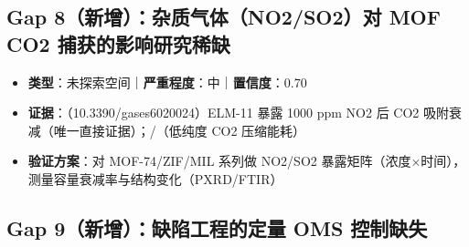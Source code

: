 \documentclass[12pt,a4paper]{ctexart}
\providecommand{\tightlist}{%
  \setlength{\itemsep}{0pt}\setlength{\parskip}{0pt}}
\begin{document}
\subsection{Gap 8（新增）：杂质气体（NO2/SO2）对 MOF CO2 捕获的影响研究稀缺}\label{gap:gap-8ux65b0ux589eux6742ux8d28ux6c14ux4f53no2so2ux5bf9-mof-co2-ux6355ux83b7ux7684ux5f71ux54cdux7814ux7a76ux7a00ux7f3a}

\begin{itemize}
\tightlist
\item
  \textbf{类型}：未探索空间｜\textbf{严重程度}：中｜\textbf{置信度}：0.70
\item
  \textbf{证据}：\cite{p216}（10.3390/gases6020024）ELM-11 暴露 1000 ppm NO2 后 CO2 吸附衰减（唯一直接证据）；\cite{p52}/\cite{p55}（低纯度 CO2 压缩能耗）
\item
  \textbf{验证方案}：对 MOF-74/ZIF/MIL 系列做 NO2/SO2 暴露矩阵（浓度×时间），测量容量衰减率与结构变化（PXRD/FTIR）
\end{itemize}

\subsection{Gap 9（新增）：缺陷工程的定量 OMS 控制缺失}\label{gap:gap-9ux65b0ux589eux7f3aux9677ux5de5ux7a0bux7684ux5b9aux91cf-oms-ux63a7ux5236ux7f3aux5931}
\end{document}
